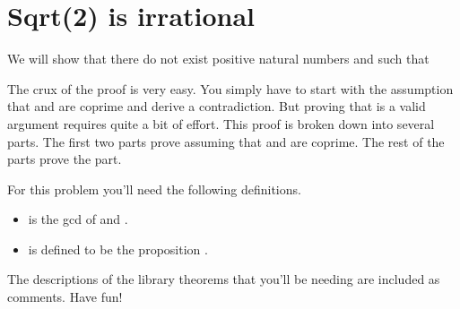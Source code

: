 \documentclass[letterpaper,10pt,english]{sphinxmanual}
\begin{document}
\section{Sqrt(2) is irrational}
\label{\detokenize{day4:id1}}
\sphinxAtStartPar
We will show that there do not exist positive natural numbers  and  such that

\begin{sphinxVerbatim}[commandchars=\\\{\}]
           
\end{sphinxVerbatim}

\sphinxAtStartPar
The crux of the proof is very easy.
You simply have to start with the assumption that  and  are coprime  and derive a contradiction.
But proving that  is a valid argument requires quite a bit of effort.
This proof is broken down into several parts.
The first two parts prove \sphinxcode{\sphinxupquote{(*)}} assuming that  and  are coprime.
The rest of the parts prove the  part.

\sphinxAtStartPar
For this problem you’ll need the following definitions.
\begin{itemize}
\item {} 
\sphinxAtStartPar
{} is the gcd of  and .

\item {} 
\sphinxAtStartPar
{} is defined to be the proposition .

\end{itemize}

\sphinxAtStartPar
The descriptions of the library theorems that you’ll be needing are included as comments.
Have fun!
\end{document}
